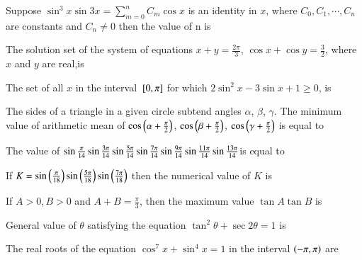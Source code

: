 \iffalse
\title{Trignometric Functions and Equations}
\author{EE24BTECH11001- ADITYA TRIPATHY}
\section{fitb}
\fi

    \item Suppose $\sin^3{x}\sin3x = \sum_{m=0}^{n} C_m \cos x $ is an identity in $x$, where $C_0, C_1, \cdots , C_n$ are constants and $C_n \neq 0$ then the value of n is
        \hfill{}


    \item The solution set of the system of equations $x + y = \frac{2\pi}{3}$, $\cos x + \cos y = \frac{3}{2}$, where $x$ and $y$ are real,is 
        \hfill{}
    \item The set of all $x$ in the interval ${}\left[0,\pi\right]$ for which $2 \sin^2 x -3\sin x +1 \ge 0$, is 

        \hfill{}



    \item The sides of a triangle in a given circle subtend angles $\alpha$, $\beta$, $\gamma$. The minimum value of arithmetic mean of $\cos \left(\alpha + \frac{\pi}{2}\right)$, $\cos \left(\beta + \frac{\pi}{2}\right)$, $\cos \left(\gamma + \frac{\pi}{2}\right)$ is equal to 
        \hfill{}



    \item The value of
        $\sin\frac{\pi}{14}\sin\frac{3\pi}{14}\sin\frac{5\pi}{14}\sin\frac{7\pi}{14}
        \\ \sin\frac{9\pi}{14}\sin\frac{11\pi}{14}\sin\frac{13\pi}{14} $is equal to  

        \hfill{}



    \item If $K = \sin\left(\frac{\pi}{18}\right)\sin\left(\frac{5\pi}{18}\right)\sin\left(\frac{7\pi}{18}\right)$ then the numerical value of $K$ is  
        \hfill{}



    \item If $A > 0, B>0$ and $A + B = \frac{\pi}{3}$, then the maximum value $\tan A \tan B$ is  
        \hfill{}



    \item General value of $\theta$ satisfying the equation $\tan^{2}\theta +\sec2\theta = 1$ is 
        \hfill{}



    \item The real roots of the equation $\cos^{7}x + \sin^{4}x = 1$ in the interval $\left(-\pi,\pi\right)$ are 
        \hfill{}

